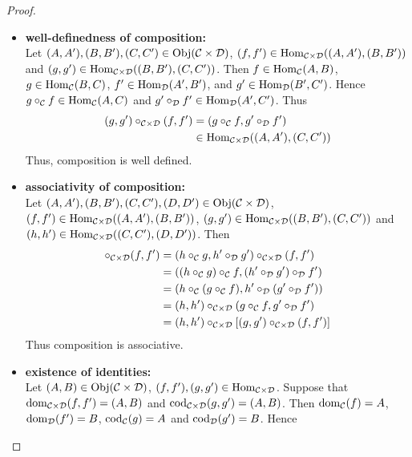 \documentclass{book}
\begin{document}
	\begin{proof}\
		\begin{itemize}
			\item \textbf{well-definedness of composition: } \\ 
			Let $(A, A'), (B, B'), (C, C') \in \operatorname{Obj}(\mathcal{C} \times \mathcal{D})$, $(f, f') \in \operatorname{Hom}_{\mathcal{C} \times \mathcal{D}}((A, A'), (B, B'))$ and $(g, g') \in \operatorname{Hom}_{\mathcal{C} \times \mathcal{D}}((B, B'), (C, C'))$. Then $f \in \operatorname{Hom}_{\mathcal{C}}(A, B)$, $g \in \operatorname{Hom}_{\mathcal{C}}(B, C)$, $f'  \in \operatorname{Hom}_{\mathcal{D}}(A', B')$, and  $g' \in \operatorname{Hom}_{\mathcal{D}}(B', C')$. Hence $g \circ_{\mathcal{C}} f \in \operatorname{Hom}_{\mathcal{C}}(A, C)$ and $g' \circ_{\mathcal{D}} f' \in \operatorname{Hom}_{\mathcal{D}}(A', C')$. Thus 
			\begin{align*}
				(g,g') \circ_{\mathcal{C} \times \mathcal{D}} (f, f') 
				&= (g \circ_{\mathcal{C}} f, g' \circ_{\mathcal{D}} f') \\
				& \in \operatorname{Hom}_{\mathcal{C} \times \mathcal{D}}((A, A'), (C, C'))
			\end{align*}
			Thus, composition is well defined. \\
			\item \textbf{associativity of composition:} \\
			Let $(A, A'), (B, B'), (C, C'), (D, D') \in \operatorname{Obj}(\mathcal{C} \times \mathcal{D})$, $(f, f') \in \operatorname{Hom}_{\mathcal{C} \times \mathcal{D}}((A, A'), (B, B'))$, $(g, g') \in \operatorname{Hom}_{\mathcal{C} \times \mathcal{D}}((B, B'), (C, C'))$ and $(h, h') \in \operatorname{Hom}_{\mathcal{C} \times \mathcal{D}}((C, C'), (D, D'))$. Then 
			\begin{align*}
				[(h, h') \circ_{\MC \times \MD} (g , g') ] \circ_{\MC \times \MD} (f, f')
				& = (h \circ_{\MC} g, h' \circ_{\MD} g') \circ_{\MC \times \MD} (f, f') \\
				& = ((h \circ_{\MC} g) \circ_{\MC} f, (h' \circ_{\MD} g') \circ_{\MD} f') \\
				& = (h \circ_{\MC} ( g \circ_{\MC} f), h' \circ_{\MD} (g' \circ_{\MD} f')) \\
				& = (h, h') \circ_{\MC \times \MD} (g \circ_{\MC} f, g' \circ_{\MD} f') \\
				& = (h, h') \circ_{\MC \times \MD} [(g, g') \circ_{\MC \times \MD} (f, f')]
			\end{align*} 
			Thus composition is associative. \\
			\item \textbf{existence of identities: } \\
			Let $(A, B) \in \operatorname{Obj}(\mathcal{C} \times \mathcal{D})$, $(f, f'), (g,g') \in \operatorname{Hom}_{\mathcal{C} \times \mathcal{D}}$. Suppose that $\operatorname{dom}_{\mathcal{C} \times \mathcal{D}}(f, f') = (A, B)$ and $\operatorname{cod}_{\mathcal{C} \times \mathcal{D}}(g, g') = (A, B)$. Then $\operatorname{dom}_{\mathcal{C}}(f) = A$, $\operatorname{dom}_{\mathcal{D}}(f') = B$, $\operatorname{cod}_{\mathcal{C}}(g) = A$ and  $\operatorname{cod}_{\mathcal{D}}(g') = B$. Hence

\end{itemize}
\end{proof}
\end{document}
